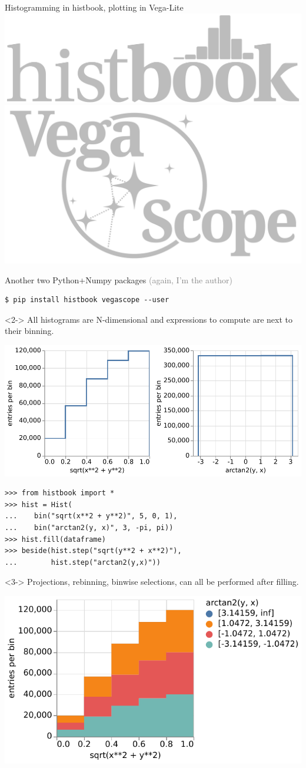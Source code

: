 \documentclass[aspectratio=169]{beamer}
\begin{document}
\begin{frame}[fragile]{Histogramming in histbook, plotting in Vega-Lite}
\normalsize
\vspace{0.5 cm}
\hfill \includegraphics[height=0.8 cm]{histbook-logo.pdf}\mbox{\includegraphics[height=0.8 cm]{vegascope-logo.pdf}\hspace{-0.75 cm}}

\vspace{-0.9 cm}
Another two Python+Numpy packages \textcolor{gray}{(again, I'm the author)}

\scriptsize
\begin{verbatim}
$ pip install histbook vegascope --user
\end{verbatim}
\normalsize

\begin{uncoverenv}<2->
All histograms are N-dimensional and expressions to compute are next to their binning.

\vspace{0.2 cm}
\hfill \includegraphics[height=2.3 cm]{histbook-beside.pdf}

\vspace{-2.5 cm}
\scriptsize
\begin{verbatim}
>>> from histbook import *
>>> hist = Hist(
...    bin("sqrt(x**2 + y**2)", 5, 0, 1),
...    bin("arctan2(y, x)", 3, -pi, pi))
>>> hist.fill(dataframe)
>>> beside(hist.step("sqrt(y**2 + x**2)"),
...        hist.step("arctan2(y,x)"))
\end{verbatim}
\normalsize
\end{uncoverenv}

\begin{uncoverenv}<3->
Projections, rebinning, binwise selections, can all be performed after filling.

\vspace{0.2 cm}
\hfill \includegraphics[height=2.3 cm]{histbook-stack.pdf}


\end{uncoverenv}
\end{frame}
\end{document}
